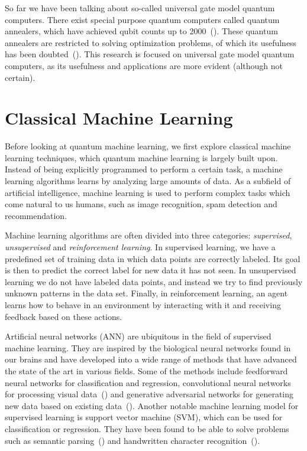 \documentclass[a4paper,10pt]{article}
\begin{document}
So far we have been talking about so-called universal gate model quantum computers.
There exist special purpose quantum computers called quantum annealers, which have achieved qubit counts up to 2000~(\cite{dwave-2000}).
These quantum annealers are restricted to solving optimization problems, of which its usefulness has been doubted~(\cite{how-quantum-dwave, aaronson-dwave, detecting-quantum-speedup}).
This research is focused on universal gate model quantum computers, as its usefulness and applications are more evident (although not certain).

\section{Classical Machine Learning} \label{sec:classical-ml}
Before looking at quantum machine learning, we first explore classical machine learning techniques, which quantum machine learning is largely built upon.
Instead of being explicitly programmed to perform a certain task, a machine learning algorithms learns by analyzing large amounts of data.
As a subfield of artificial intelligence, machine learning is used to perform complex tasks which come natural to us humans, such as image recognition, spam detection and recommendation.

Machine learning algorithms are often divided into three categories: \emph{supervised}, \emph{unsupervised} and \emph{reinforcement learning}.
In supervised learning, we have a predefined set of training data in which data points are correctly labeled.
Its goal is then to predict the correct label for new data it has not seen.
In unsupervised learning we do not have labeled data points, and instead we try to find previously unknown patterns in the data set.
Finally, in reinforcement learning, an agent learns how to behave in an environment by interacting with it and receiving feedback based on these actions.

Artificial neural networks (ANN) are ubiquitous in the field of supervised machine learning.
They are inspired by the biological neural networks found in our brains and have developed into a wide range of methods that have advanced the state of the art in various fields.
Some of the methods include feedforward neural networks for classification and regression, convolutional neural networks for processing visual data~(\cite{cirecsan2012multi}) and generative adversarial networks for generating new data based on existing data~(\cite{goodfellow2014generative}).
Another notable machine learning model for supervised learning is support vector machine (SVM), which can be used for classification or regression.
They have been found to be able to solve problems such as semantic parsing~(\cite{pradhan2004shallow}) and handwritten character recognition~(\cite{decoste2002training}).
\end{document}
